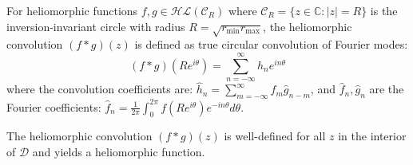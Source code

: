 \begin{definition}
For heliomorphic functions $f, g \in \mathcal{HL}(\mathcal{C}_R)$ where $\mathcal{C}_R = \{z \in \mathbb{C} : |z| = R\}$ is the inversion-invariant circle with radius $R = \sqrt{r_{\min} r_{\max}}$, the heliomorphic convolution $(f * g)(z)$ is defined as true circular convolution of Fourier modes:
\begin{equation}
(f * g)(Re^{i\theta}) = \sum_{n=-\infty}^{\infty} \hat{h}_n e^{in\theta}
\end{equation}
where the convolution coefficients are: $\hat{h}_n = \sum_{m=-\infty}^{\infty} \hat{f}_m \hat{g}_{n-m}$, and $\hat{f}_n, \hat{g}_n$ are the Fourier coefficients: $\hat{f}_n = \frac{1}{2\pi} \int_0^{2\pi} f(Re^{i\theta}) e^{-in\theta} d\theta$.
\end{definition}

\begin{theorem}
\label{thm:heliomorphic_convolution_welldef}
The heliomorphic convolution $(f * g)(z)$ is well-defined for all $z$ in the interior of $\mathcal{D}$ and yields a heliomorphic function.
\end{theorem}

